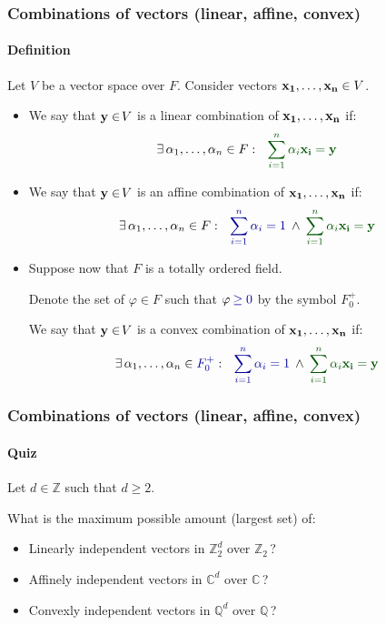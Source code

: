 \documentclass{beamer}
\renewcommand{\.}{\hskip .75pt}
\DeclareMathOperator{\aand}{\;\wedge\;}
\begin{document}
\begin{frame}
	\frametitle{Combinations of vectors (linear, affine, convex)}
	\framesubtitle{Definition}
	
	Let $V$ be a vector space over $F$.		
	Consider vectors $\bold{x_1}, \dots, \bold{x_n} \in V$.
	\smallskip
	
	\begin{itemize}
		\setlength{\abovedisplayskip}{0pt}
		\setlength{\belowdisplayskip}{4pt}
		\pause \item We say that $\bold{y} \in\! V$ is a \textcolor{dred}{linear combination} of $\bold{x_1}, \dots, \bold{x_n}$ if:
		$$\exists\, \alpha_1, \dots, \alpha_n \in F : \ \  \textcolor{dgreen}{\sum_{i=1}^{n} \alpha_i \bold{x_i} = \bold{y}}$$
		\pause \item We say that $\bold{y} \in\! V$ is an \textcolor{dred}{affine combination} of $\bold{x_1}, \dots, \bold{x_n}$ if:
		$$\exists\, \alpha_1, \dots, \alpha_n \in F : \ \   \textcolor{dblue}{\sum_{i=1}^{n} \alpha_i = 1} \aand \textcolor{dgreen}{\sum_{i=1}^{n} \alpha_i \bold{x_i} = \bold{y}}$$
		\pause \item Suppose now that $F$ is a totally ordered field.
		
		Denote the set of $\varphi \in\! F$ such that $\varphi \textcolor{dblue}{\:\ge 0}$ by the symbol \textcolor{dblue}{$F_0^+$}.
		
		We say that $\bold{y} \in\! V$ is a \textcolor{dred}{convex combination} of $\bold{x_1}, \dots, \bold{x_n}$ if:
		$$\exists\, \alpha_1, \dots, \alpha_n \in \textcolor{dblue}{F_0^+} : \ \   \textcolor{dblue}{\sum_{i=1}^{n} \alpha_i = 1} \aand \textcolor{dgreen}{\sum_{i=1}^{n} \alpha_i \bold{x_i} = \bold{y}}$$
	\end{itemize}
\end{frame}

\begin{frame}
	\frametitle{Combinations of vectors (linear, affine, convex)}
	\framesubtitle{Quiz}
	
	Let $d \in \mathbb{Z}$ such that $d \ge 2$. 
	
	What is the \textcolor{dblue}{maximum} possible amount (largest set) of:
	\begin{itemize}
		\item \textcolor{dred}{Linear}ly independent vectors in $\mathbb{Z}_2^d$ over $\mathbb{Z}_2\,$? \\
		\visible<2->{\textcolor{dblue}{$d$}}
		\item \textcolor{dred}{Affine}ly independent vectors in $\mathbb{C}^d$ over $\mathbb{C}\,$? \\
		\visible<3->{\textcolor{dblue}{$d+1$}}
		\item \textcolor{dred}{Convex}ly independent vectors in $\mathbb{Q}^d$ over $\mathbb{Q}\,$? \\
		\visible<4->{\textcolor{dblue}{$\infty$}}
	\end{itemize}

\end{frame}
\end{document}
